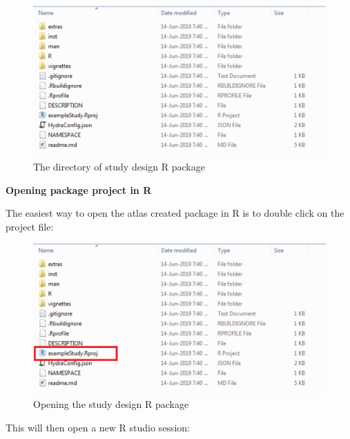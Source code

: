 \documentclass[11pt]{book}
\theoremstyle{definition}
\theoremstyle{definition}
\theoremstyle{definition}
\theoremstyle{remark}
\begin{document}
\begin{figure}
\includegraphics[width=1\linewidth]{images/PatientLevelPrediction/atlasImplementation/download_folder} \caption{The directory of study design R package}\label{fig:figureU10}
\end{figure}

\textbf{Opening package project in R}

The easiest way to open the atlas created package in R is to double click on the project file:

\begin{figure}
\includegraphics[width=1\linewidth]{images/PatientLevelPrediction/atlasImplementation/download_folder_project} \caption{Opening the study design R package}\label{fig:figureU11}
\end{figure}

This will then open a new R studio session:
\end{document}
